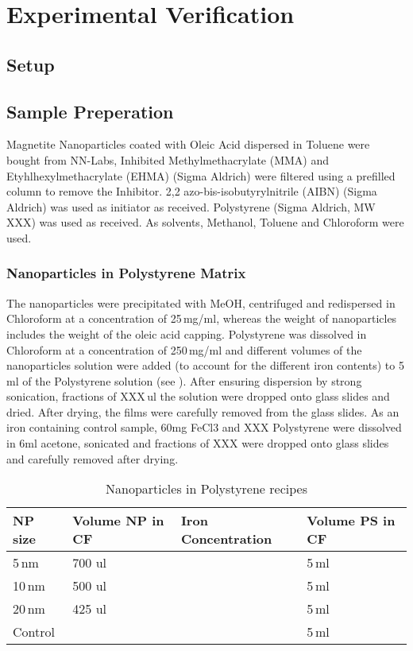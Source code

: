 \chapter{Experimental Verification}
\section{Setup}
\section{Sample Preperation}
Magnetite Nanoparticles coated with Oleic Acid dispersed in Toluene were bought from NN-Labs, Inhibited Methylmethacrylate (MMA) and Etyhlhexylmethacrylate (EHMA)  (Sigma Aldrich) were filtered using a prefilled column to remove the Inhibitor.  2,2 azo-bis-isobutyrylnitrile (AIBN) (Sigma Aldrich) was used as initiator as received. Polystyrene (Sigma Aldrich, MW XXX) was used as received. As solvents, Methanol, Toluene and Chloroform were used.
\subsection{Nanoparticles in Polystyrene Matrix}
The nanoparticles were precipitated with MeOH, centrifuged and redispersed in Chloroform at a concentration of 25\,mg/ml, whereas the weight of nanoparticles includes the weight of the oleic acid capping. Polystyrene was dissolved in Chloroform at a concentration of 250\,mg/ml and different volumes of the nanoparticles solution were added (to account for the different iron contents) to 5\,ml of the Polystyrene solution (see ). After ensuring dispersion by strong sonication, fractions of XXX\,ul the solution were dropped onto glass slides and dried. After drying, the films were carefully removed from the glass slides.
As an iron containing control sample, 60mg FeCl3 and XXX Polystyrene were dissolved in 6ml acetone, sonicated and  fractions of XXX were dropped onto glass slides and carefully removed after drying.
\begin{table}
	\centering
	\caption{Nanoparticles in Polystyrene recipes}
	\label{tab:samplePS}
	\begin{tabular}{llll}
		\hline
	NP size&   Volume NP in CF &  Iron Concentration &Volume PS in CF    \\
		\hline
	  5\,nm&700 ul & & 5\,ml  \\  
	   10\,nm&  500 ul& &5\,ml  \\    
	   20\,nm &  425 ul& &5\,ml  \\  
	   	Control   &  & &5\,ml  \\  
		\hline
	\end{tabular}
\end{table}

